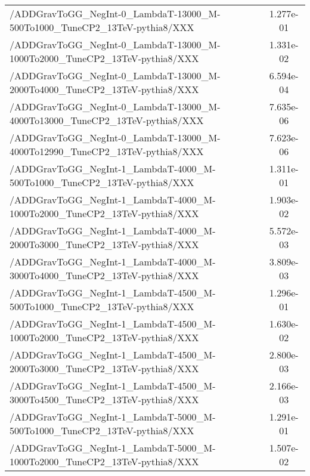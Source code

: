 \begin{landscape}
\begin{table}[!htbp]
\begin{tabular}{lc}
/ADDGravToGG\_NegInt-0\_LambdaT-13000\_M-500To1000\_TuneCP2\_13TeV-pythia8/XXX &  1.277e-01\\
/ADDGravToGG\_NegInt-0\_LambdaT-13000\_M-1000To2000\_TuneCP2\_13TeV-pythia8/XXX &  1.331e-02\\
/ADDGravToGG\_NegInt-0\_LambdaT-13000\_M-2000To4000\_TuneCP2\_13TeV-pythia8/XXX &  6.594e-04\\
/ADDGravToGG\_NegInt-0\_LambdaT-13000\_M-4000To13000\_TuneCP2\_13TeV-pythia8/XXX &  7.635e-06\\
/ADDGravToGG\_NegInt-0\_LambdaT-13000\_M-4000To12990\_TuneCP2\_13TeV-pythia8/XXX &  7.623e-06\\
/ADDGravToGG\_NegInt-1\_LambdaT-4000\_M-500To1000\_TuneCP2\_13TeV-pythia8/XXX &  1.311e-01\\
/ADDGravToGG\_NegInt-1\_LambdaT-4000\_M-1000To2000\_TuneCP2\_13TeV-pythia8/XXX &  1.903e-02\\
/ADDGravToGG\_NegInt-1\_LambdaT-4000\_M-2000To3000\_TuneCP2\_13TeV-pythia8/XXX &  5.572e-03\\
/ADDGravToGG\_NegInt-1\_LambdaT-4000\_M-3000To4000\_TuneCP2\_13TeV-pythia8/XXX &  3.809e-03\\
/ADDGravToGG\_NegInt-1\_LambdaT-4500\_M-500To1000\_TuneCP2\_13TeV-pythia8/XXX &  1.296e-01\\
/ADDGravToGG\_NegInt-1\_LambdaT-4500\_M-1000To2000\_TuneCP2\_13TeV-pythia8/XXX &  1.630e-02\\
/ADDGravToGG\_NegInt-1\_LambdaT-4500\_M-2000To3000\_TuneCP2\_13TeV-pythia8/XXX &  2.800e-03\\
/ADDGravToGG\_NegInt-1\_LambdaT-4500\_M-3000To4500\_TuneCP2\_13TeV-pythia8/XXX &  2.166e-03\\
/ADDGravToGG\_NegInt-1\_LambdaT-5000\_M-500To1000\_TuneCP2\_13TeV-pythia8/XXX &  1.291e-01\\
/ADDGravToGG\_NegInt-1\_LambdaT-5000\_M-1000To2000\_TuneCP2\_13TeV-pythia8/XXX &  1.507e-02\\

       \hline \hline
       \end{tabular}
       \label{table:ADD_signal_samples_xsec}
\end{table}
\end{landscape}

